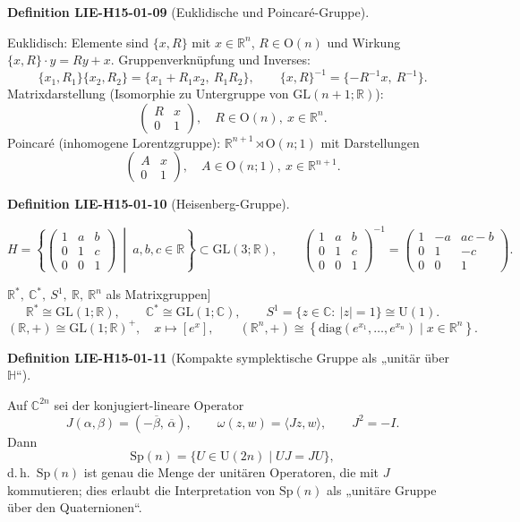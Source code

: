 \documentclass[10pt, letterpaper]{article}
\newcommand{\R}{\mathbb{R}}
\newcommand{\C}{\mathbb{C}}
\newcommand{\GL}{\mathrm{GL}}
\newcommand{\Sp}{\mathrm{Sp}}
\newcommand{\Ogroup}{\mathrm{O}} %
\newcommand{\U}{\mathrm{U}}
\newcommand{\CustomHeading}[3]{%
  \par\medskip\noindent%
  \textbf{#1 #2} \textnormal{(#3)}.\enskip%
}
\newenvironment{DEF}[2]{\CustomHeading{Definition}{#1}{#2}}{}
\begin{document}
\begin{DEF}{LIE-H15-01-09}{Euklidische und Poincaré-Gruppe}
Euklidisch: Elemente sind $\{x,R\}$ mit $x\in\R^n$, $R\in\Ogroup(n)$ und Wirkung $\{x,R\}\cdot y=Ry+x$.
Gruppenverknüpfung und Inverses:
\[
\{x_1,R_1\}\{x_2,R_2\}=\{x_1+R_1x_2,\ R_1R_2\},\qquad
\{x,R\}^{-1}=\{-R^{-1}x,\ R^{-1}\}.
\]
Matrixdarstellung (Isomorphie zu Untergruppe von $\GL(n{+}1;\R)$):
\[
\begin{pmatrix}
R & x\\
0 & 1
\end{pmatrix},\quad R\in\Ogroup (n),\ x\in\R^n.
\]
Poincaré (inhomogene Lorentzgruppe): $\R^{n+1}\rtimes \Ogroup (n;1)$ mit Darstellungen
\[
\begin{pmatrix}
A & x\\
0 & 1
\end{pmatrix},\quad A\in\Ogroup (n;1),\ x\in\R^{n+1}.
\]
\end{DEF}

\begin{DEF}{LIE-H15-01-10}{Heisenberg-Gruppe}
\[
H=\left\{
\begin{pmatrix}
1 & a & b\\
0 & 1 & c\\
0 & 0 & 1
\end{pmatrix}
\ \middle|\ a,b,c\in\R
\right\}\subset \GL(3;\R),\qquad
\begin{pmatrix}
1 & a & b\\
0 & 1 & c\\
0 & 0 & 1
\end{pmatrix}^{-1}
=
\begin{pmatrix}
1 & -a & ac-b\\
0 & 1 & -c\\
0 & 0 & 1
\end{pmatrix}.
\]

$\R^*,\ \C^*,\ S^1,\ \R,\ \R^n$ als Matrixgruppen]
\[
\R^* \cong \GL(1;\R),\qquad \C^* \cong \GL(1;\C),\qquad S^1=\{z\in\C:\ |z|=1\}\cong \U(1).
\]
\[
(\R,+)\cong \GL(1;\R)^+,\quad x\mapsto [e^x],\qquad
(\R^n,+)\cong\left\{\mathrm{diag}(e^{x_1},\dots,e^{x_n})\mid x\in\R^n\right\}.
\]
\end{DEF}

\begin{DEF}{LIE-H15-01-11}{Kompakte symplektische Gruppe als „unitär über $\mathbb{H}$“}
Auf $\C^{2n}$ sei der konjugiert-lineare Operator
\[
J(\alpha,\beta)=(-\overline{\beta},\,\overline{\alpha}),\qquad
\omega(z,w)=\langle Jz,w\rangle,\qquad J^2=-I.
\]
Dann
\[
\Sp(n)=\{U\in \U(2n)\mid UJ=JU\},
\]
d.\,h.\ $\Sp(n)$ ist genau die Menge der unitären Operatoren, die mit $J$ kommutieren; dies erlaubt die Interpretation von $\Sp(n)$ als „unitäre Gruppe über den Quaternionen“.
\end{DEF}
\end{document}
